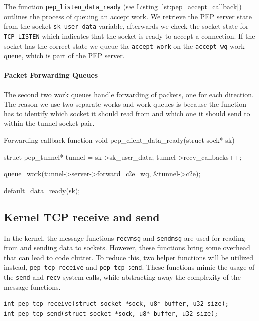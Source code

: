 \documentclass[a4paper,english, 12pt]{report}
\begin{document}
The function \verb|pep_listen_data_ready| (see Listing \ref{lst:pep_accept_callback}) outlines the process of queuing an accept work. We retrieve the PEP server state from the socket \verb|sk_user_data| variable, afterwards we check the socket state for \verb|TCP_LISTEN| which indicates that the socket is ready to accept a connection. If the socket has the correct state we queue the \verb|accept_work| on the \verb|accept_wq| work queue, which is part of the PEP server.

\paragraph{Packet Forwarding Queues}\label{sec:forward_queues}
The second two work queues handle forwarding of packets, one for each direction. The reason we use two separate works and work queues is because the function has to identify which socket it should read from and which one it should send to within the tunnel socket pair. \\

\begin{autonumlstlisting}[label=lst:pep_forward_callback]{Forwarding callback function}
void pep_client_data_ready(struct sock* sk)
{
	struct pep_tunnel* tunnel = sk->sk_user_data;
	tunnel->recv_callbacks++;
        
	queue_work(tunnel->server->forward_c2e_wq, &tunnel->c2e);
        
	default_data_ready(sk);
}
\end{autonumlstlisting}

\subsection{Kernel TCP receive and send}
In the kernel, the message functions \verb|recvmsg| and \verb|sendmsg| are used for reading from and sending data to sockets. However, these functions bring some overhead that can lead to code clutter. To reduce this, two helper functions will be utilized instead, \verb|pep_tcp_receive| and \verb|pep_tcp_send|. These functions mimic the usage of the \verb|send| and \verb|recv| system calls, while abstracting away the complexity of the message functions.\\

\begin{verbatim}
int pep_tcp_receive(struct socket *sock, u8* buffer, u32 size);
int pep_tcp_send(struct socket *sock, u8* buffer, u32 size);
\end{verbatim}
\end{document}
